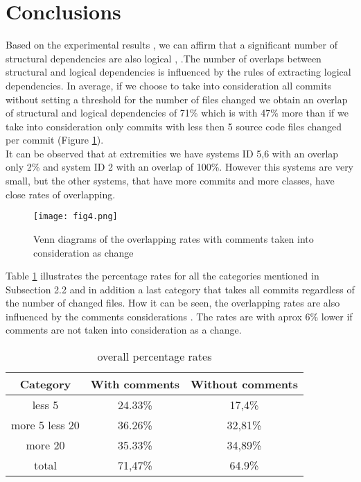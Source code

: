 \documentclass[conference,compsoc]{IEEEtran}
\begin{document}
\section{Conclusions}

Based on the experimental results , we can affirm that a significant number of structural dependencies are also logical \cite{ct10}, \cite{ct9}.The number of overlaps between structural and logical dependencies is influenced by the rules of extracting logical dependencies. In average, if we choose to take into consideration all commits without setting a threshold for the number of files changed we obtain an overlap of structural and logical dependencies of 71\% which is with 47\% more than if we take into consideration only commits with less then 5 source code files changed per commit (Figure \ref{fig:fig4}). \\ It can be observed that at extremities we have systems ID 5,6 with an overlap only 2\% and system ID 2 with an overlap of 100\%. However this systems are very small, but the other systems, that have more commits and more classes, have close rates of overlapping.
\begin{figure}[H]
\centering
\texttt{[image: fig4.png]}
\caption{Venn diagrams of the overlapping rates with comments taken into consideration as change}
\label{fig:fig4}
\end{figure}


Table \ref{table:7} illustrates the percentage rates for all the categories mentioned in Subsection 2.2 and in addition a last category that takes all commits regardless of the number of changed files. How it can be seen, the overlapping rates are also influenced by the comments considerations . The rates are with aprox 6\% lower if comments are not taken into consideration as a change. 


\begin{table}[H]
  \centering
  \begin{tabular}{@{}c||cc@{}}
    \toprule
       Category & With comments & Without comments  \\
    \midrule
less 5	&	24.33\% &	17,4\%	\\
more 5 less 20	&	36.26\% &	32,81\%\\
more 20	&	35.33\%	&	34,89\%\\
total & 71,47\% & 64.9\% \\
    \bottomrule
  \end{tabular}
  \caption{ overall percentage rates }
   \label{table:7}
\end{table}
\end{document}
